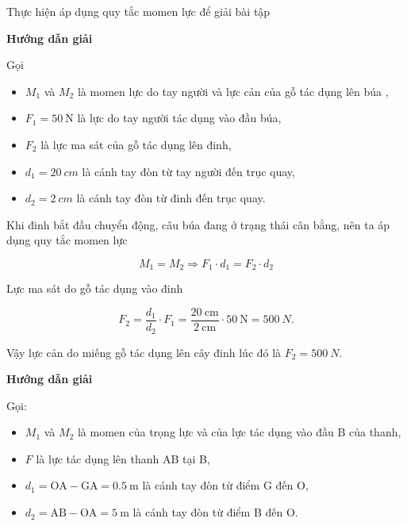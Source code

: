 \begin{dang}{Thực hiện áp dụng quy tắc momen lực để giải bài tập}
	{	\begin{center}
			\textbf{Hướng dẫn giải}
		\end{center}
		
		Gọi 
		\begin{itemize}
			\item $M_1$ và $M_2$ là momen lực do tay người và lực cản của gỗ tác dụng lên búa ,
			\item $F_1=\SI{50}{\newton}$ là lực do tay người tác dụng vào đầu búa,
			\item $F_2$ là lực ma sát của gỗ tác dụng lên đinh, 
			\item  $d_1=\SI{20}{cm}$ là cánh tay đòn từ tay người đến trục quay, 
			\item  $d_2=\SI{2}{cm}$ là cánh tay đòn từ đinh đến trục quay. 
		\end{itemize}
		
		Khi đinh bắt đầu chuyển động, câu búa đang ở trạng thái cân bằng, nên ta áp dụng quy tắc momen lực
		
		$$M_1=M_2 \Rightarrow F_1\cdot d_1 = F_2\cdot d_2$$
		
		Lực ma sát do gỗ tác dụng vào đinh 
		
		$$F_2=\dfrac{d_1}{d_2}\cdot F_1=\dfrac{\SI{20}{\centi\meter}}{\SI{2}{\centi\meter}}\cdot\SI{50}{\newton}=\SI{500}{N}.$$
		
		Vậy lực cản do miếng gỗ tác dụng lên cây đinh lúc đó là $F_2=\SI{500}{N}$.
	}
	{	\begin{center}
			\textbf{Hướng dẫn giải}
		\end{center}
		
		Gọi: 
		\begin{itemize}
			\item $M_1$ và $M_2$ là momen của trọng lực và của lực  tác dụng vào đầu B của thanh,
			\item $F$ là lực tác dụng lên thanh AB tại B, 
			\item  $d_1=\text{OA}-\text{GA}=\SI{0.5}{\meter}$ là cánh tay đòn từ điểm G đến O, 
			\item  $d_2=\text{AB}-\text{OA}=\SI{5}{\meter}$ là cánh tay đòn từ điểm B đến O.
		\end{itemize}
		
}
\end{dang}
